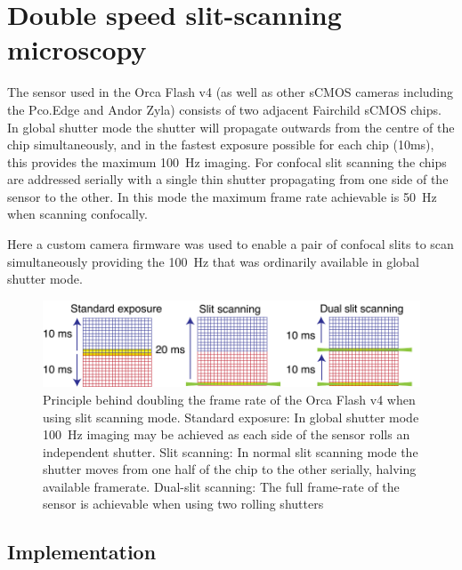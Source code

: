 \section{Double speed slit-scanning microscopy}

The sensor used in the Orca Flash v4 (as well as other sCMOS cameras including the Pco.Edge and Andor Zyla) consists of two adjacent Fairchild sCMOS chips.
In global shutter mode the shutter will propagate outwards from the centre of the chip simultaneously, and in the fastest exposure possible for each chip (10ms), this provides the maximum \SI{100}{\hertz} imaging.
For confocal slit scanning the chips are addressed serially with a single thin shutter propagating from one side of the sensor to the other.
In this mode the maximum frame rate achievable is \SI{50}{\hertz} when scanning confocally.

Here a custom camera firmware was used to enable a pair of confocal slits to scan simultaneously providing the \SI{100}{\hertz} that was ordinarily available in global shutter mode.

\begin{figure}
  \centering
  \includegraphics{dual_slit_scanning}
  \caption{
  Principle behind doubling the frame rate of the Orca Flash v4 when using slit scanning mode.
  Standard exposure: In global shutter mode \SI{100}{\hertz} imaging may be achieved as each side of the sensor rolls an independent shutter.
  Slit scanning: In normal slit scanning mode the shutter moves from one half of the chip to the other serially, halving available framerate.
  Dual-slit scanning:
  The full frame-rate of the sensor is achievable when using two rolling shutters
  }
  \label{fig:dual_slit_scanning}
\end{figure}

\subsection{Implementation}
